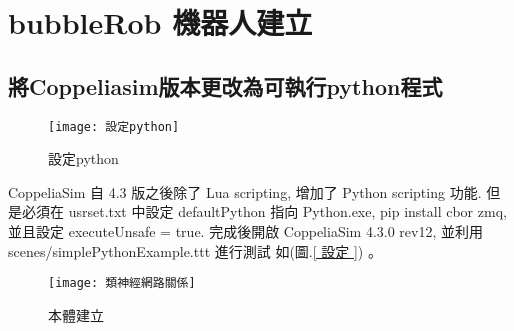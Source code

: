 \chapter{bubbleRob 機器人建立}
\section{將Coppeliasim版本更改為可執行python程式}
\begin{figure}[hbt!]
\begin{center}
\texttt{[image: 設定python]}
\caption{\Large 設定python }\label{ 設定python }
\end{center}
\end{figure} 
 CoppeliaSim 自 4.3 版之後除了 Lua scripting, 增加了 Python scripting 功能. 但是必須在 usrset.txt 中設定 defaultPython 指向 Python.exe, pip install cbor zmq, 並且設定 executeUnsafe = true. 完成後開啟 CoppeliaSim 4.3.0 rev12, 並利用 scenes/simplePythonExample.ttt 進行測試  如(圖.\ref{ 設定 }) 。\\


\newpage
\begin{figure}
\begin{center}
\texttt{[image: 類神經網路關係]}
\caption{\Large 本體建立}
\label{本體建立}
\end{center}
\end{figure}
